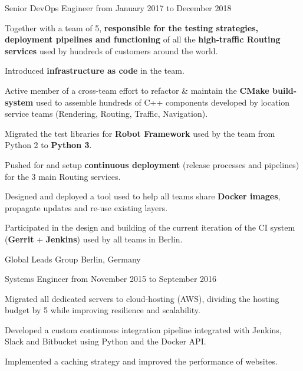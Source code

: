\documentclass[10pt, a4paper]{awesome-cv}
\begin{document}
\begin{cventries}
	\vspace{2pt}
	\cventry
	{Senior DevOps Engineer}
	{from January 2017 to December 2018}
	{
		\begin{cvitems}
			\item {Together with a team of 5, \textbf{responsible for the testing strategies, deployment pipelines and functioning} of all the \textbf{high-traffic Routing services} used by hundreds of customers around the world.}
			\item {Introduced \textbf{infrastructure as code} in the team.}
			\item {Active member of a cross-team effort to refactor \& maintain the \textbf{CMake build-system} used to assemble hundreds of C++ components developed by location service teams (Rendering, Routing, Traffic, Navigation).}
			\item {Migrated the test libraries for \textbf{Robot Framework} used by the team from Python 2 to \textbf{Python 3}.}
			\item {Pushed for and setup \textbf{continuous deployment} (release processes and pipelines) for the 3 main Routing services.}
			\item {Designed and deployed a tool used to help all teams share \textbf{Docker images}, propagate updates and re-use existing layers.}
			\item {Participated in the design and building of the current iteration of the CI system (\textbf{Gerrit} + \textbf{Jenkins}) used by all teams in Berlin.}
		\end{cvitems}
	}
\end{cventries}

\begin{cventries}


	\cventrytitle
	{Global Leads Group}
	{Berlin, Germany}

	\cventry
	{Systems Engineer}
	{from November 2015 to September 2016}
	{
		\begin{cvitems}
			\item {Migrated all dedicated servers to cloud-hosting (AWS), dividing the hosting budget by 5 while improving resilience and scalability.}
			\item {Developed a custom continuous integration pipeline integrated with Jenkins, Slack and Bitbucket using Python and the Docker API.}
			\item {Implemented a caching strategy and improved the performance of websites.}
		\end{cvitems}
	}

\end{cventries}
\end{document}
